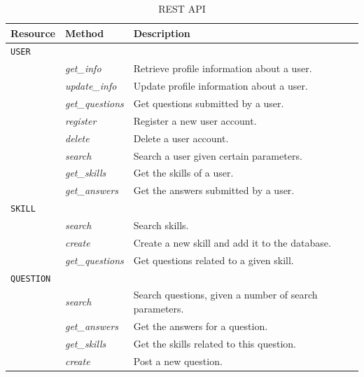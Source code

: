 \begin{table}
	\caption{REST API}
	
	\begin{center}
		\begin{tabular}{p{70px} | p{70px} | p{210px}}
				\hline
				\hline
				\textbf{Resource} 		& \textbf{Method}					&	\textbf{Description} 	\\
				\hline
				\hline
				\texttt{USER}					&	\\
				\hline
															& \emph{get\_info}				&	Retrieve profile information about a user.	\\
															& \emph{update\_info}			& Update profile information about a user. \\
															& \emph{get\_questions}		& Get questions submitted by a user. \\
															& \emph{register}					&	Register a new user account. \\
															& \emph{delete}						&	Delete a user account. \\
															& \emph{search}						&	Search a user given certain parameters. \\
															& \emph{get\_skills}			& Get the skills of a user. \\
															& \emph{get\_answers}			& Get the answers submitted by a user. \\
				\hline
				\texttt{SKILL}				& 												& \\
				\hline
															& \emph{search}						& Search skills. \\
															& \emph{create}						& Create a new skill and add it to the database. \\
															& \emph{get\_questions}		& Get questions related to a given skill. \\
				\hline
				\texttt{QUESTION}			& 												& \\
				\hline
															& \emph{search}						& Search questions, given a number of search parameters. \\
															& \emph{get\_answers}			& Get the answers for a question. \\
															& \emph{get\_skills}			& Get the skills related to this question. \\
															& \emph{create}						& Post a new question. \\

\end{tabular}
\end{center}
\end{table}
